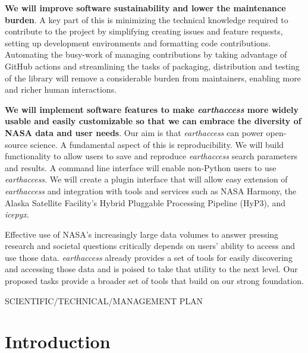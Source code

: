 \documentclass{ROSES-NASA-proposal}
\newcommand{\earthaccess}{\textit{earthaccess}\xspace} %
\newif\ifsubmitpdf
\begin{document}
\textbf{We will improve software sustainability and lower the maintenance burden}.  A key part of this is minimizing the technical knowledge required to contribute to the project by simplifying creating issues and feature requests, setting up development environments and formatting code contributions. Automating the busy-work of managing contributions by taking advantage of GitHub actions and streamlining the tasks of packaging, distribution and testing of the library will remove a considerable burden from maintainers, enabling more and richer human interactions.

\textbf{We will implement software features to make \earthaccess more widely usable and easily customizable so that we can embrace the diversity of NASA data and user needs}.  Our aim is that \earthaccess can power open-source science.  A fundamental aspect of this is reproducibility.  We will build functionality to allow users to save and reproduce \earthaccess search parameters and results.  A command line interface will enable non-Python users to use \earthaccess.  We will create a plugin interface that will allow easy extension of \earthaccess and integration with tools and services such as NASA Harmony, the Alaska Satellite Facility's Hybrid Pluggable Processing Pipeline (HyP3), and \textit{icepyx}.
    
Effective use of NASA's increasingly large data volumes to answer pressing research and societal questions critically depends on users' ability to access and use those data. \earthaccess already provides a set of tools for easily discovering and accessing those data and is poised to take that utility to the next level. Our proposed tasks provide a broader set of tools that build on our strong foundation.

\newpage

\ifsubmitpdf
\else
\begin{center}
{\LARGE\MakeUppercase {Scientific/Technical/Management Plan}}
\end{center}
\fi

\tableofcontents

\newpage 


\section{Introduction}
\end{document}
